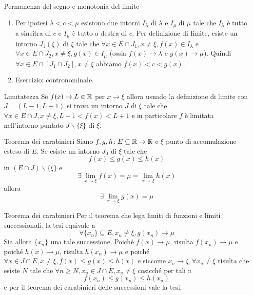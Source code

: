 \documentclass[a4paper]{article}
\begin{document}
\begin{snippetproof}{Permanenza del segno e monotonia del limite}
    \begin{enumerate}
        \item Per ipotesi \(\lambda < c < \mu\)
        esistono due intorni \(I_\lambda\) di \(\lambda\)
        e \(I_\mu\) di \(\mu\) tale che \(I_\lambda\)
        è tutto a sinsitra di \(c\) e \(I_\mu\) è tutto a destra di \(c\).
        Per definizione di limite, esiste un intorno \(J_1(\xi)\) di \(\xi\)
        tale che \(\forall x \in E \cap J_1, x\neq \xi, f(x) \in I_\lambda\)
        e \(\forall x \in E \cap J_2, x\neq \xi, g(x) \in I_\mu\)
        (ossia \(f(x) \to \lambda\) e \(g(x) \to \mu\)).
        Quindi \(\forall x \in E \cap [J_1 \cap J_2], x\neq\xi\) abbiamo
        \(f(x) < c < g(x)\).
        \item Esercizio: contronominale.
    \end{enumerate}
\end{snippetproof}

\begin{snippetproposition}{Limitatezza}
    Se \(f(x) \to L \in \mathbb{R}\) per \(x\to\xi\)
    allora usnado la definizione di limite con \(J=(L - 1, L+1)\)
    si trova un intorno \(J\) di \(\xi\) tale che
    \(\forall x \in E \cap J, x\neq\xi, L - 1 < f(x) < L+1\)
    e in particolare \(f\) è limitata nell'intorno puntato \(J \backslash \{\xi\}\)
    di \(\xi\).
\end{snippetproposition}

\begin{radioactive}
\begin{snippettheorem}{Teorema dei carabinieri}
    Siano \(f,g,h\colon E\subseteq \mathbb{R} \to \mathbb{R}\)
    e \(\xi\) punto di accumulazione esteso di \(E\).
    Se esiste un intorno \(J_0\) di \(\xi\) tale che
    \[
        f(x) \leq g(x) \leq h(x)
    \]
    in \((E \cap J) \backslash \{\xi\}\)
    e
    \[
        \exists\, \lim_{x\to\xi}f(x) = \mu = \lim_{x\to\xi}h(x)
    \]
    allora
    \[
        \exists\, \lim_{x\to\xi}g(x) = \mu
    \]
\end{snippettheorem}

\begin{snippetproof}{Teorema dei carabinieri}
    Per il teorema che lega limiti di funzioni e limiti successionali, la tesi equivale a
    \[
        \forall \{x_n\} \subseteq E, x_n \neq \xi,
        g(x_n) \to \mu
    \]
    Sia allora \(\{x_n\}\) una tale successione. Poiché
    \(f(x) \to \mu\), risulta \(f(x_n) \to \mu\)
    e poiché
    \(h(x) \to \mu\), risulta \(h(x_n) \to \mu\)
    e poiché \(\forall x \in J \cap E, x \neq \xi, f(x) \leq g(x) \leq h(x)\)
    e siccome \(x_n \to \xi, \forall x_n \neq \xi\) risulta che esiste \(N\)
    tale che \(\forall n \geq N, x_n \in J \cap E, x_n \neq \xi\)
    cosicché per tali n
    \[
        f(x_n) \leq g(x_n) \leq h(x_n)
    \]
    e per il teorema dei carabinieri delle successioni vale la tesi.
\end{snippetproof}
\end{radioactive}
\end{document}
